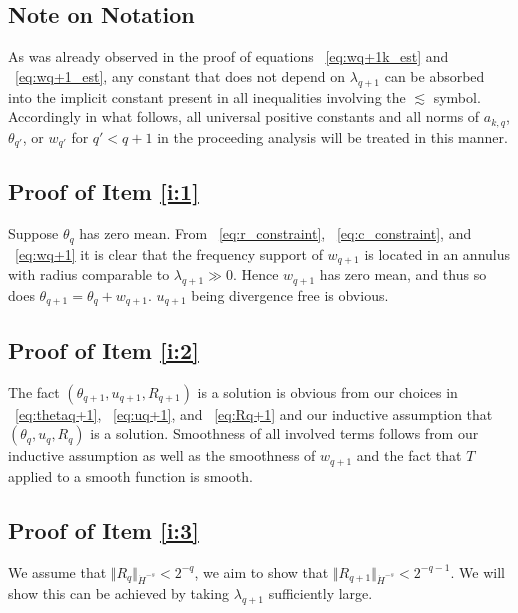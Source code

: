 \documentclass[12pt,reqno,letterpaper]{amsart}
\numberwithin{equation}{section}
\newcommand{\1}{{\bf 1}}
\newcommand{\2}{{\bf 2}}
\theoremstyle{remark}
\theoremstyle{remark}
\begin{document}
\subsection{Note on Notation} As was already observed in the proof of equations ~\eqref{eq:wq+1k_est} and ~\eqref{eq:wq+1_est}, any constant that does not depend on $\lambda_{q+1}$ can be absorbed into the implicit constant present in all inequalities involving the $\lesssim$ symbol. Accordingly in what follows, all universal positive constants and all norms of $a_{k,q}$, $\theta_{q'}$, or $w_{q'}$ for $q' < q+1$ in the proceeding analysis will be treated in this manner.


\subsection{Proof of Item \ref{i:1}}
Suppose $\theta_q$ has zero mean. From ~\eqref{eq:r_constraint}, ~\eqref{eq:c_constraint}, and ~\eqref{eq:wq+1} it is clear that the frequency support of $w_{q+1}$ is located in an annulus with radius comparable to $\lambda_{q+1} \gg 0$. Hence $w_{q+1}$ has zero mean, and thus so does $\theta_{q+1} = \theta_q + w_{q+1}$. $u_{q+1}$ being divergence free is obvious.










\subsection{Proof of Item \ref{i:2}}
The fact $(\theta_{q+1},u_{q+1},R_{q+1})$ is a solution is obvious from our choices in ~\eqref{eq:thetaq+1}, ~\eqref{eq:uq+1}, and ~\eqref{eq:Rq+1} and our inductive assumption that $(\theta_q,u_q,R_q)$ is a solution. Smoothness of all involved terms follows from our inductive assumption as well as the smoothness of $w_{q+1}$ and the fact that $T$ applied to a smooth function is smooth.








\subsection{Proof of Item \ref{i:3}}\label{section:osc}
We assume that $\Vert R_q \Vert_{\dot{H}^{-s}} < 2^{-q}$, we aim to show that $\Vert R_{q+1} \Vert_{\dot{H}^{-s}} < 2^{-q-1}$. We will show this can be achieved by taking $\lambda_{q+1}$ sufficiently large.
\end{document}
